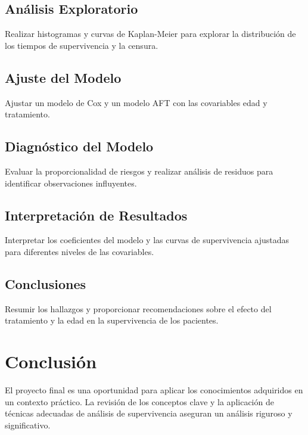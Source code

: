 \documentclass[a4paper]{report} %
\begin{document}
\subsection{An\'alisis Exploratorio}
Realizar histogramas y curvas de Kaplan-Meier para explorar la distribuci\'on de los tiempos de supervivencia y la censura.

\subsection{Ajuste del Modelo}
Ajustar un modelo de Cox y un modelo AFT con las covariables edad y tratamiento.

\subsection{Diagn\'ostico del Modelo}
Evaluar la proporcionalidad de riesgos y realizar an\'alisis de residuos para identificar observaciones influyentes.

\subsection{Interpretaci\'on de Resultados}
Interpretar los coeficientes del modelo y las curvas de supervivencia ajustadas para diferentes niveles de las covariables.

\subsection{Conclusiones}
Resumir los hallazgos y proporcionar recomendaciones sobre el efecto del tratamiento y la edad en la supervivencia de los pacientes.

\section{Conclusi\'on}
El proyecto final es una oportunidad para aplicar los conocimientos adquiridos en un contexto pr\'actico. La revisi\'on de los conceptos clave y la aplicaci\'on de t\'ecnicas adecuadas de an\'alisis de supervivencia aseguran un an\'alisis riguroso y significativo.
\end{document}
